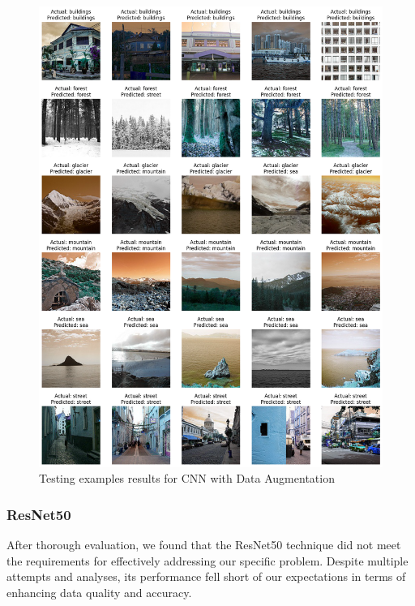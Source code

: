 \documentclass[conference]{IEEEtran}
\begin{document}
\begin{figure}[H]
    \centering
    \includegraphics[width=1\linewidth]{images//CNN/Examples_CNN_augmented.png}
    \caption{Testing examples results for CNN with Data Augmentation}
    \label{fig:enter-label}
\end{figure}

\subsubsection{ResNet50}

After thorough evaluation, we found that the ResNet50 technique did not meet the requirements for effectively addressing our specific problem. Despite multiple attempts and analyses, its performance fell short of our expectations in terms of enhancing data quality and accuracy.
\end{document}
